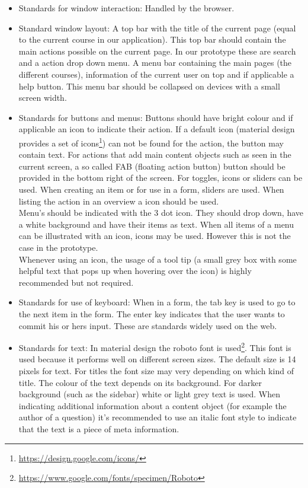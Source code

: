 \begin{itemize}

\item Standards for window interaction: Handled by the browser.
\item Standard window layout: A top bar with the title of the current page (equal to the current course in our application). This top bar should contain the main actions possible on the current page. In our prototype these are search and a action drop down menu. A menu bar containing the main pages (the different courses), information of the current user on top and if applicable a help button. This menu bar should be collapsed on devices with a small screen width.
\item Standards for buttons and menus: Buttons should have bright colour and if applicable an icon to indicate their action. If a default icon (material design provides a set of icons\footnote{\url{https://design.google.com/icons/}}) can not be found for the action, the button may contain text. For actions that add main content objects such as seen in the current screen, a so called FAB (floating action button) button should be provided in the bottom right of the screen. For toggles, icons or sliders can be used. When creating an item or for use in a form, sliders are used. When listing the action in an overview a icon should be used.\\
Menu's should be indicated with the 3 dot icon. They should drop down, have a white background and have their items as text. When all items of a menu can be illustrated with an icon, icons may be used. However this is not the case in the prototype.\\
Whenever using an icon, the usage of a tool tip (a small grey box with some helpful text that pops up when hovering over the icon) is highly recommended but not required. 
\item Standards for use of keyboard: When in a form, the tab key is used to go to the next item in the form. The enter key indicates that the user wants to commit his or hers input. These are standards widely used on the web.
\item Standards for text: In material design the roboto font is used\footnote{\url{https://www.google.com/fonts/specimen/Roboto}}. This font is used because it performs well on different screen sizes. The default size is 14 pixels for text. For titles the font size may very depending on which kind of title. The colour of the text depends on its background. For darker background (such as the sidebar) white or light grey text is used. When indicating additional information about a content object (for example the author of a question) it's recommended to use an italic font style to indicate that the text is a piece of meta information.

\end{itemize}
